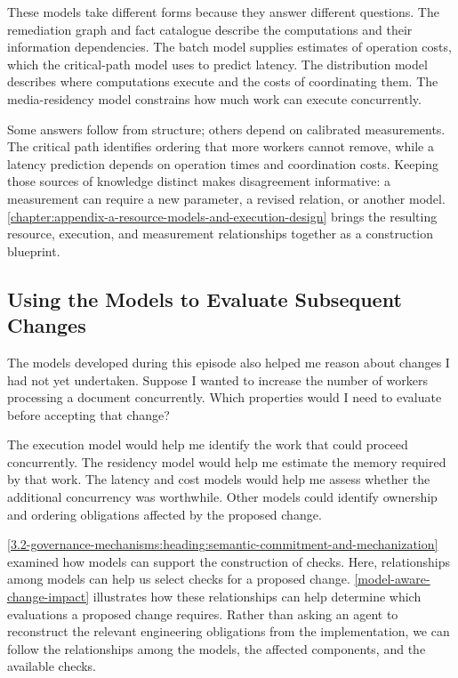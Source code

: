 These models take different forms because they answer different questions. The remediation graph and fact catalogue describe the computations and their information dependencies. The batch model supplies estimates of operation costs, which the critical-path model uses to predict latency. The distribution model describes where computations execute and the costs of coordinating them. The media-residency model constrains how much work can execute concurrently.

Some answers follow from structure; others depend on calibrated measurements. The critical path identifies ordering that more workers cannot remove, while a latency prediction depends on operation times and coordination costs. Keeping those sources of knowledge distinct makes disagreement informative: a measurement can require a new parameter, a revised relation, or another model. \autoref{chapter:appendix-a-resource-models-and-execution-design} brings the resulting resource, execution, and measurement relationships together as a construction blueprint.


\subsection{Using the Models to Evaluate Subsequent Changes}\label{heading:model-aware-change-impact}

The models developed during this episode also helped me reason about changes I had not yet undertaken. Suppose I wanted to increase the number of workers processing a document concurrently. Which properties would I need to evaluate before accepting that change?

The execution model would help me identify the work that could proceed concurrently. The residency model would help me estimate the memory required by that work. The latency and cost models would help me assess whether the additional concurrency was worthwhile. Other models could identify ownership and ordering obligations affected by the proposed change.

\autoref{3.2-governance-mechanisms:heading:semantic-commitment-and-mechanization} examined how models can support the construction of checks. Here, relationships among models can help us select checks for a proposed change. \autoref{model-aware-change-impact} illustrates how these relationships can help determine which evaluations a proposed change requires. Rather than asking an agent to reconstruct the relevant engineering obligations from the implementation, we can follow the relationships among the models, the affected components, and the available checks.

